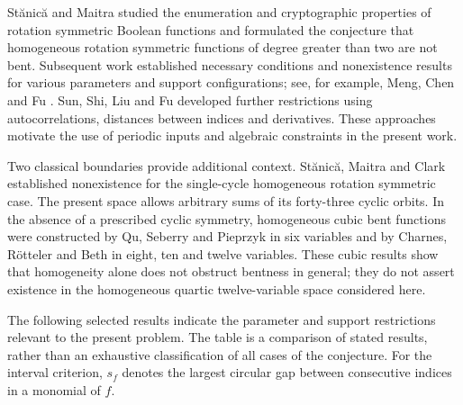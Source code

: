 \documentclass[pdflatex,sn-mathphys-num]{sn-jnl}
\begin{document}
St\u{a}nic\u{a} and Maitra \cite{ref2} studied the enumeration and cryptographic properties of rotation symmetric Boolean functions and formulated the conjecture that homogeneous rotation symmetric functions of degree greater than two are not bent. Subsequent work established necessary conditions and nonexistence results for various parameters and support configurations; see, for example, Meng, Chen and Fu \cite{ref3}. Sun, Shi, Liu and Fu \cite{ref4} developed further restrictions using autocorrelations, distances between indices and derivatives. These approaches motivate the use of periodic inputs and algebraic constraints in the present work.

Two classical boundaries provide additional context. St\u{a}nic\u{a}, Maitra and Clark \cite{ref5} established nonexistence for the single-cycle homogeneous rotation symmetric case. The present space allows arbitrary sums of its forty-three cyclic orbits. In the absence of a prescribed cyclic symmetry, homogeneous cubic bent functions were constructed by Qu, Seberry and Pieprzyk \cite{ref6} in six variables and by Charnes, Rötteler and Beth \cite{ref7} in eight, ten and twelve variables. These cubic results show that homogeneity alone does not obstruct bentness in general; they do not assert existence in the homogeneous quartic twelve-variable space considered here.

The following selected results indicate the parameter and support restrictions relevant to the present problem. The table is a comparison of stated results, rather than an exhaustive classification of all cases of the conjecture. For the interval criterion, $s_f$ denotes the largest circular gap between consecutive indices in a monomial of $f$.
\end{document}
